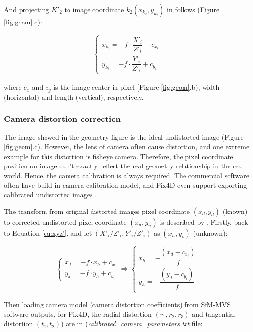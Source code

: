 \documentclass{configs/bmcart}
\begin{document}
And projecting $K'_2$ to image coordinate $k_2 (x_{k_2}, y_{k_2})$ in follows \cite{pix4d_support_how_2020} (Figure \ref{fig:geom}.c):

\begin{align}
  \label{eq:xyz'}
  \begin{cases}
    x_{k_i} = - f \cdot \dfrac{X'_i}{Z'_i} + c_{x_i} \\
    y_{k_i} = - f \cdot \dfrac{Y'_i}{Z'_i} + c_{y_i}
  \end{cases}
\end{align}

where $c_x$ and $c_y$ is the image center in pixel (Figure \ref{fig:geom}.b), width (horizontal) and length (vertical), respectively. 

\subsubsection*{Camera distortion correction}
The image showed in the geometry figure is the ideal undistorted image (Figure \ref{fig:geom}.c). However, the lens of camera often cause distortion, and one extreme example for this distortion is fisheye camera. Therefore, the pixel coordinate position on image can't exactly reflect the real geometry relationship in the real world. Hence, the camera calibration is always required. The commercial software often have build-in camera calibration model, and Pix4D even support exporting calibrated undistorted images \cite{pix4d_support_menu_2020}. 

The transform from original distorted images pixel coordinate $(x_d, y_d)$ (known) to corrected undistorted pixel coordinate $(x_u, y_u)$ is described by \cite{pix4d_support_how_2020}. Firstly, back to Equation \ref{eq:xyz'}, and let $(X'_i / Z'_i, Y'_i / Z'_i)$ as $(x_h, y_h)$ (unknown):

$$
\begin{cases}
  x_d = - f \cdot x_h + c_{x_i} \\
  y_d = - f \cdot y_h + c_{y_i}
\end{cases}
\Rightarrow
\begin{cases}
  x_h  = - \dfrac{(x_d - c_{x_i})}{f} \\
  y_h  = - \dfrac{(y_d - c_{y_i})}{f} \\
\end{cases}
$$

Then loading camera model (camera distortion coefficients) from SfM-MVS software outputs, for Pix4D, the radial distortion $(r_1, r_2, r_3)$ and tangential distortion $(t_1, t_2)$) are in (\textit{calibrated\_camera\_parameters.txt} file:
\end{document}
